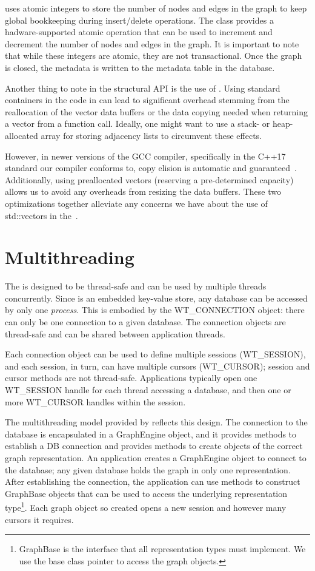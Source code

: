 \project{} uses atomic integers to store the number of nodes and edges in the graph to keep global bookkeeping during insert/delete operations.
The  class provides a hadware-supported atomic operation that can be used to increment and decrement the number of nodes and edges in the graph.
It is important to note that while these integers are atomic, they are not transactional.
Once the graph is closed, the metadata is written to the metadata table in the database.

Another thing to note in the structural API is the use of .
Using standard containers in the code in \api{} can lead to significant overhead stemming from the reallocation of the vector data buffers or the data copying needed when returning a vector from a function call.
Ideally, one might want to use a stack- or heap-allocated array for storing adjacency lists to circumvent these effects.

However, in newer versions of the GCC compiler, specifically in the C++17 standard our compiler conforms to, copy elision is automatic and guaranteed~\cite{Copyelis0:online}.
Additionally, using preallocated vectors (reserving a pre-determined capacity) allows us to avoid any overheads from resizing the data buffers.
These two optimizations together alleviate any concerns we have about the use of std::vectors in the~\api{}.


\section{Multithreading}
\label{arch:multithreading}
The \api{} is designed to be thread-safe and can be used by multiple threads concurrently.
Since \wt{} is an embedded key-value store, any database can be accessed by only one \emph{process}.
This is embodied by the WT\_CONNECTION object: there can only be one connection to a given database.
The connection objects are thread-safe and can be shared between application threads.

Each connection object can be used to define multiple sessions (WT\_SESSION), and each session, in turn, can have multiple cursors (WT\_CURSOR); \wt{} session and cursor methods are not thread-safe.
Applications typically open one WT\_SESSION handle for each thread accessing a database, and then one or more WT\_CURSOR handles within the session.

The multithreading model provided by \project{} reflects this design.
The connection to the database is encapsulated in a GraphEngine object, and it provides methods to establish a DB connection and provides methods to create objects of the correct graph representation.
An application creates a GraphEngine object to connect to the database; any given database holds the graph in only one representation.
After establishing the connection, the application can use methods to construct GraphBase objects that can be used to access the underlying representation type\footnote{GraphBase is the interface that all representation types must implement. We use the base class pointer to access the graph objects.}.
Each graph object so created opens a new session and however many cursors it requires.

